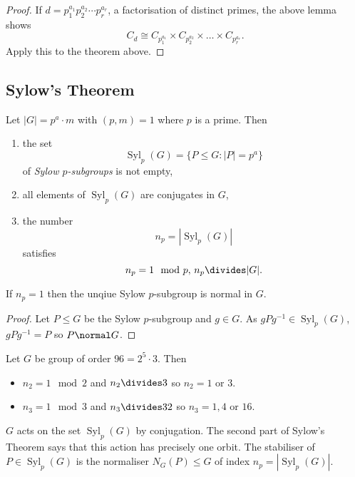 \documentclass[a4paper]{article}
\theoremstyle{definition}
\DeclareMathOperator{\syl}{Syl}
\begin{document}
\begin{proof}
  If \(d = p_1^{a_1}p_2^{a_2}\cdots p_r^{a_r}\), a factorisation of distinct primes, the above lemma shows
  \[
    C_d \cong C_{p_1^{a_1}} \times C_{p_2^{a_2}} \times \dots \times C_{p_r^{a_r}}.
  \]
  Apply this to the theorem above.
\end{proof}

\subsection{Sylow's Theorem}

\begin{theorem}
  \label{thm:sylow}
  Let \(|G| = p^a \cdot m\) with \((p, m) = 1\) where \(p\) is a prime. Then
  \begin{enumerate}
  \item the set
    \[
      \syl_p(G) = \{P \leq G: |P| = p^a\}
    \]
    of \emph{Sylow \(p\)-subgroups} is not empty,
  \item all elements of \(\syl_p(G)\) are conjugates in \(G\),
  \item the number
    \[
      n_p = |\syl_p(G)|
    \]
    satisfies
    \[
      n_p = 1 \mod p, \, n_p \divides |G|.
    \]
  \end{enumerate}
\end{theorem}

\begin{lemma}
  If \(n_p = 1\) then the unqiue Sylow \(p\)-subgroup is normal in \(G\).
\end{lemma}

\begin{proof}
  Let \(P \leq G\) be the Sylow \(p\)-subgroup and \(g \in G\). As \(gPg^{-1} \in \syl_p(G)\), \(gPg^{-1} = P\) so \(P \normal G\).
\end{proof}

\begin{eg}
  Let \(G\) be group of order \(96 = 2^5 \cdot 3\). Then
  \begin{itemize}
  \item \(n_2 = 1 \mod 2\) and \(n_2 \divides 3\) so \(n_2 = 1\) or \(3\).
  \item \(n_3 = 1 \mod 3\) and \(n_3 \divides 32\) so \(n_3 = 1, 4\) or \(16\).
  \end{itemize}
\end{eg}

\(G\) acts on the set \(\syl_p(G)\) by conjugation. The second part of Sylow's Theorem says that this action has precisely one orbit. The stabiliser of \(P \in \syl_p(G)\) is the normaliser \(N_G(P) \leq G\) of index \(n_p = |\syl_p(G)|\).
\end{document}
